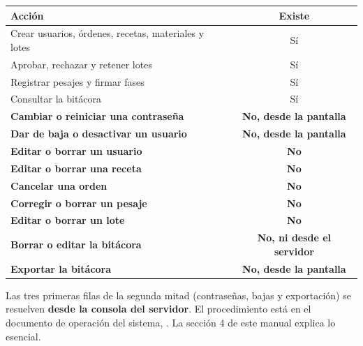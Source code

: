 \begin{center}
\begin{tabularx}{\linewidth}{@{}>{\raggedright\arraybackslash}X c@{}}
\toprule
\textbf{Acción} & \textbf{Existe} \\
\midrule
Crear usuarios, órdenes, recetas, materiales y lotes  & Sí \\
Aprobar, rechazar y retener lotes                     & Sí \\
Registrar pesajes y firmar fases                      & Sí \\
Consultar la bitácora                                 & Sí \\
\midrule
\textbf{Cambiar o reiniciar una contraseña}           & \textbf{No, desde la pantalla} \\
\textbf{Dar de baja o desactivar un usuario}          & \textbf{No, desde la pantalla} \\
\textbf{Editar o borrar un usuario}                   & \textbf{No} \\
\textbf{Editar o borrar una receta}                   & \textbf{No} \\
\textbf{Cancelar una orden}                           & \textbf{No} \\
\textbf{Corregir o borrar un pesaje}                  & \textbf{No} \\
\textbf{Editar o borrar un lote}                      & \textbf{No} \\
\textbf{Borrar o editar la bitácora}                  & \textbf{No, ni desde el servidor} \\
\textbf{Exportar la bitácora}                         & \textbf{No, desde la pantalla} \\
\bottomrule
\end{tabularx}
\end{center}

\begin{cajaNota}
Las tres primeras filas de la segunda mitad (contraseñas, bajas y exportación) se
resuelven \textbf{desde la consola del servidor}. El procedimiento está en el documento
de operación del sistema, . La sección 4 de este manual explica
lo esencial.
\end{cajaNota}


\newpage
{}


